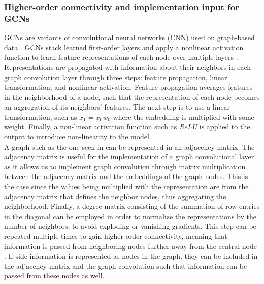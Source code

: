 \subsubsection*{Higher-order connectivity and implementation input for GCNs}
GCNs are variants of convolutional neural networks (CNN) used on graph-based data \cite{KOrderConnectivity}.
GCNs stack learned first-order layers and apply a nonlinear activation function to learn feature representations of each node over multiple layers \cite{KOrderConnectivity}.
Representations are propagated with information about their neighbors in each graph convolution layer through three steps: feature propagation, linear transformation, and nonlinear activation.
Feature propagation averages features in the neighborhood of a node, such that the representation of each node becomes an aggregation of its neighbors' features.
The next step is to use a linear transformation, such as $x_1 = x_0w_0$ where the embedding is multiplied with some weight.
Finally, a non-linear activation function such as \textit{ReLU} is applied to the output to introduce non-linearity to the model.
\\
A graph such as the one seen in  can be represented in an adjacency matrix.
The adjacency matrix is useful for the implementation of a graph convolutional layer as it allows us to implement graph convolution through matrix multiplication between the adjacency matrix and the embeddings of the graph nodes.
This is the case since the values being multiplied with the representation are from the adjacency matrix that defines the neighbor nodes, thus aggregating the neighborhood.
Finally, a degree matrix consisting of the summation of row entries in the diagonal can be employed in order to normalize the representations by the number of neighbors, to avoid exploding or vanishing gradients.
This step can be repeated multiple times to gain higher-order connectivity, meaning that information is passed from neighboring nodes further away from the central node \cite{SimplifyingGCN, KOrderConnectivity}.
If side-information is represented as nodes in the graph, they can be included in the adjacency matrix and the graph convolution such that information can be passed from these nodes as well.
